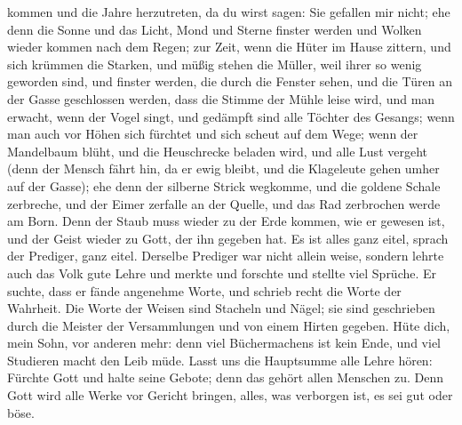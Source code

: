 kommen und die Jahre herzutreten, da du wirst sagen: Sie gefallen mir
nicht;  ehe denn die Sonne und das Licht, Mond und Sterne
finster werden und Wolken wieder kommen nach dem Regen;  zur
Zeit, wenn die Hüter im Hause zittern, und sich krümmen die Starken, und
müßig stehen die Müller, weil ihrer so wenig geworden sind, und finster
werden, die durch die Fenster sehen,  und die Türen an der
Gasse geschlossen werden, dass die Stimme der Mühle leise wird, und man
erwacht, wenn der Vogel singt, und gedämpft sind alle Töchter des
Gesangs;  wenn man auch vor Höhen sich fürchtet und sich
scheut auf dem Wege; wenn der Mandelbaum blüht, und die Heuschrecke
beladen wird, und alle Lust vergeht (denn der Mensch fährt hin, da er
ewig bleibt, und die Klageleute gehen umher auf der Gasse); 
ehe denn der silberne Strick wegkomme, und die goldene Schale zerbreche,
und der Eimer zerfalle an der Quelle, und das Rad zerbrochen werde am
Born.  Denn der Staub muss wieder zu der Erde kommen, wie er
gewesen ist, und der Geist wieder zu Gott, der ihn gegeben hat.
 Es ist alles ganz eitel, sprach der Prediger, ganz eitel.
 Derselbe Prediger war nicht allein weise, sondern lehrte
auch das Volk gute Lehre und merkte und forschte und stellte viel
Sprüche.  Er suchte, dass er fände angenehme Worte, und
schrieb recht die Worte der Wahrheit.  Die Worte der Weisen
sind Stacheln und Nägel; sie sind geschrieben durch die Meister der
Versammlungen und von einem Hirten gegeben.  Hüte dich,
mein Sohn, vor anderen mehr: denn viel Büchermachens ist kein Ende, und
viel Studieren macht den Leib müde.  Lasst uns die
Hauptsumme alle Lehre hören: Fürchte Gott und halte seine Gebote; denn
das gehört allen Menschen zu.  Denn Gott wird alle Werke
vor Gericht bringen, alles, was verborgen ist, es sei gut oder böse.
